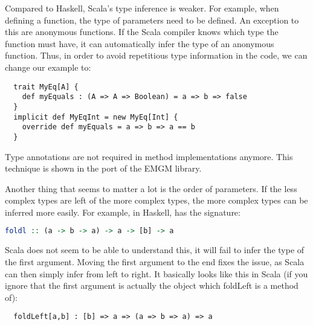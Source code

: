 Compared to Haskell, Scala's type inference is weaker. For example, when
defining a function, the type of parameters need to be defined. An exception
to this are anonymous functions. If the Scala compiler knows which type the
function must have, it can automatically infer the type of an anonymous
function. Thus, in order to avoid repetitious type information in the code,
we can change our  example to:
\begin{lstlisting}
  trait MyEq[A] {
    def myEquals : (A => A => Boolean) = a => b => false
  }
  implicit def MyEqInt = new MyEq[Int] {
    override def myEquals = a => b => a == b
  }
\end{lstlisting}
Type annotations are not required in method implementations anymore. This
technique is shown in the port of the EMGM library.

Another thing that seems to matter a lot is the order of parameters. If
the less complex types are left of the more complex types, the more
complex types can be inferred more easily. For example, in Haskell,
 has the signature:
\begin{lstlisting}[language=Haskell]
  foldl :: (a -> b -> a) -> a -> [b] -> a
\end{lstlisting}
Scala does not seem to be able to understand this, it will fail to
infer the type of the first argument. Moving the first argument to
the end fixes the issue, as Scala can then simply infer from left
to right. It basically looks like this in Scala (if you ignore that
the first argument is actually the object which foldLeft is a method
of):
\begin{lstlisting}
  foldLeft[a,b] : [b] => a => (a => b => a) => a
\end{lstlisting}
